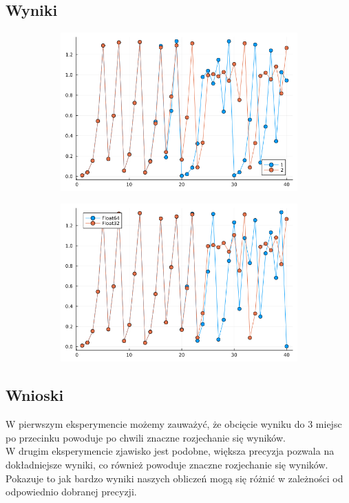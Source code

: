 \documentclass{article}
\def\v{0.47}
\begin{document}
\subsection*{Wyniki}
	\begin{figure}[H]
		\centering
		\begin{subfigure}[b]{\v\linewidth}
			\includegraphics[width=\linewidth]{graphs/5.1.png}
		\end{subfigure}
		\begin{subfigure}[b]{\v\linewidth}
			\includegraphics[width=\linewidth]{graphs/5.2.png}
		\end{subfigure}
	\end{figure}
\subsection*{Wnioski}
	W pierwszym eksperymencie możemy zauważyć, że obcięcie wyniku do 3 miejsc po przecinku powoduje po chwili znaczne rozjechanie się wyników. \\
	W drugim eksperymencie zjawisko jest podobne, większa precyzja pozwala na dokładniejsze wyniki, co również powoduje znaczne rozjechanie się wyników. \\
	Pokazuje to jak bardzo wyniki naszych obliczeń mogą się różnić w zależności od odpowiednio dobranej precyzji.
	
\end{document}
